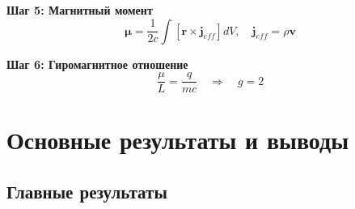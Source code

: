\documentclass[12pt,a4paper]{article}
\begin{document}
\textbf{Шаг 5: Магнитный момент}
\begin{equation}
    \boldsymbol{\mu} = \frac{1}{2c} \int [\mathbf{r} \times \mathbf{j}_{eff}] dV, \quad \mathbf{j}_{eff} = \rho \mathbf{v}
\end{equation}

\textbf{Шаг 6: Гиромагнитное отношение}
\begin{equation}
    \frac{\mu}{L} = \frac{q}{m c} \quad \Rightarrow \quad g = 2
\end{equation}

\section{Основные результаты и выводы}

\subsection{Главные результаты}
\end{document}
